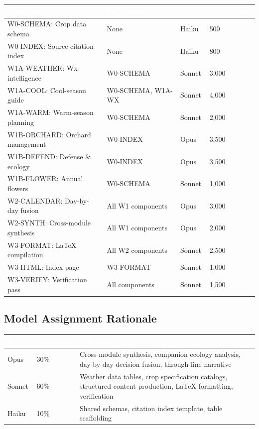 \documentclass[11pt,letterpaper]{article}
\newcommand{\tableheader}[1]{\textbf{\sffamily\textcolor{white}{#1}}}
\begin{document}
\begin{center}
\begin{tabularx}{\textwidth}{L{3.5cm}L{2.5cm}C{1.5cm}C{1.5cm}}
\toprule
{}
\tableheader{Component} & \tableheader{Dependencies} & \tableheader{Model} & \tableheader{Est.\ Tokens} \\
\midrule
W0-SCHEMA: Crop data schema & None & Haiku & 500 \\
W0-INDEX: Source citation index & None & Haiku & 800 \\
W1A-WEATHER: Wx intelligence & W0-SCHEMA & Sonnet & 3,000 \\
W1A-COOL: Cool-season guide & W0-SCHEMA, W1A-WX & Sonnet & 4,000 \\
W1A-WARM: Warm-season planning & W0-SCHEMA & Sonnet & 2,000 \\
W1B-ORCHARD: Orchard management & W0-INDEX & Opus & 3,500 \\
W1B-DEFEND: Defense \& ecology & W0-INDEX & Opus & 3,500 \\
W1B-FLOWER: Annual flowers & W0-SCHEMA & Sonnet & 1,000 \\
W2-CALENDAR: Day-by-day fusion & All W1 components & Opus & 3,000 \\
W2-SYNTH: Cross-module synthesis & All W1 components & Opus & 2,000 \\
W3-FORMAT: LaTeX compilation & All W2 components & Sonnet & 2,500 \\
W3-HTML: Index page & W3-FORMAT & Sonnet & 1,000 \\
W3-VERIFY: Verification pass & All components & Sonnet & 1,500 \\
\bottomrule
\end{tabularx}
\end{center}

\subsection{Model Assignment Rationale}

\begin{center}
\begin{tabularx}{\textwidth}{C{1.5cm}C{1.5cm}X}
\toprule
{}
\tableheader{Model} & \tableheader{Allocation} & \tableheader{Rationale} \\
\midrule
Opus & 30\% & Cross-module synthesis, companion ecology analysis, day-by-day decision fusion, through-line narrative \\
Sonnet & 60\% & Weather data tables, crop specification catalogs, structured content production, LaTeX formatting, verification \\
Haiku & 10\% & Shared schemas, citation index template, table scaffolding \\
\bottomrule
\end{tabularx}
\end{center}
\end{document}
